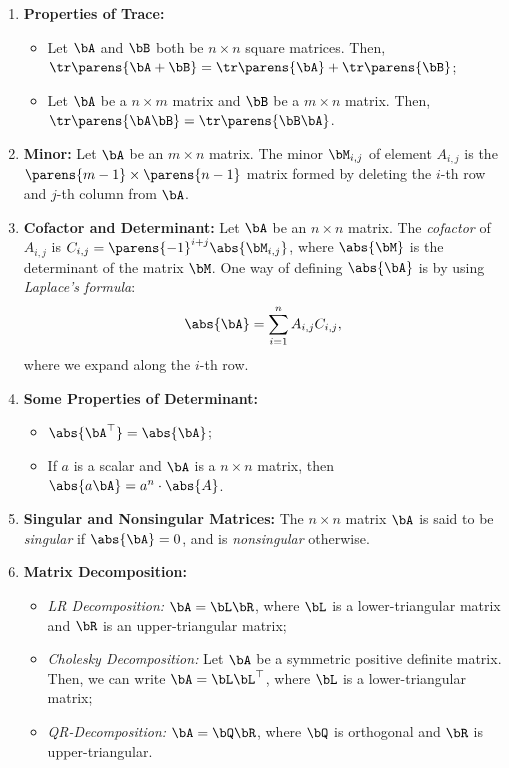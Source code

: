 \documentclass[12pt]{article}
\begin{document}
\begin{enumerate}[label=\textbf{\arabic*.}]
	\item \textbf{Properties of Trace:} 
	\begin{itemize}
		\item Let $\bA$ and $\bB$ both be $n \times n$ square matrices. Then, $\tr \parens{\bA + \bB} = \tr \parens{\bA} + \tr \parens{\bB}$; 
		\item Let $\bA$ be a $n \times m$ matrix and $\bB$ be a $m \times n$ matrix. Then, $\tr \parens{\bA \bB} = \tr \parens{\bB \bA}$. 
	\end{itemize}
	
	\item \textbf{Minor:} Let $\bA$ be an $m \times n$ matrix. The minor $\bM_{i,j}$ of element $A_{i,j}$ is the $\parens{m-1} \times \parens{n-1}$ matrix formed by deleting the $i$-th row and $j$-th column from $\bA$. 
	
	\item \textbf{Cofactor and Determinant:} Let $\bA$ be an $n \times n$ matrix. The \textit{cofactor} of $A_{i,j}$ is $ C_{i,j} = \parens{-1}^{i+j} \abs{\bM_{i,j}}$, where $\abs{\bM}$ is the determinant of the matrix $\bM$. One way of defining $\abs{\bA}$ is by using \textit{Laplace's formula}: 
	\begin{align*}
		\abs{\bA} = \sum_{i=1}^n A_{i,j} C_{i,j}, 
	\end{align*}
	where we expand along the $i$-th row. 
	
	\item \textbf{Some Properties of Determinant:} 
	\begin{itemize}
		\item $\abs{\bA^\top} = \abs{\bA}$; 
		\item If $a$ is a scalar and $\bA$ is a $n \times n$ matrix, then $\abs{a \bA} = a^n \cdot \abs{A}$. 
	\end{itemize}
	
	\item \textbf{Singular and Nonsingular Matrices:} The $n \times n$ matrix $\bA$ is said to be \textit{singular} if $\abs{\bA} = 0$, and is \textit{nonsingular} otherwise. 
	
	\item \textbf{Matrix Decomposition:} 
	\begin{itemize}
		\item \textit{LR Decomposition:} $\bA = \bL \bR$, where $\bL$ is a lower-triangular matrix and $\bR$ is an upper-triangular matrix; 
		\item \textit{Cholesky Decomposition:} Let $\bA$ be a symmetric positive definite matrix. Then, we can write $\bA = \bL \bL^\top$, where $\bL$ is a lower-triangular matrix; 
		\item \textit{QR-Decomposition:} $\bA = \bQ \bR$, where $\bQ$ is orthogonal and $\bR$ is upper-triangular. 
	\end{itemize}
	

\end{enumerate}
\end{document}
